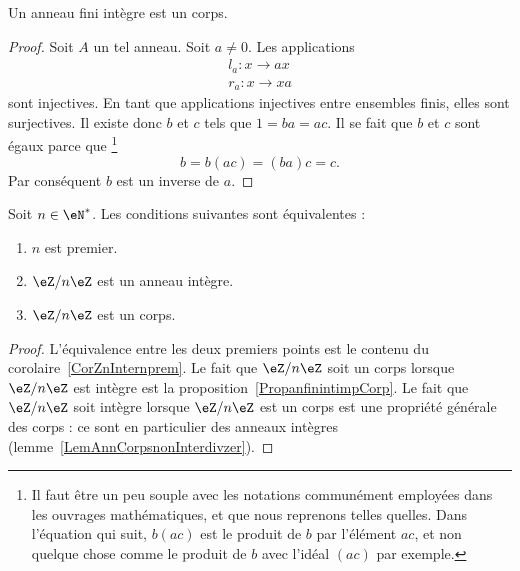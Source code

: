 \begin{proposition}     \label{PropanfinintimpCorp}
    Un anneau fini intègre est un corps.
\end{proposition}

\begin{proof}
    Soit \( A\) un tel anneau. Soit \( a\neq 0\). Les applications
    \begin{subequations}
        \begin{align}
            l_a\colon x\to ax\\
            r_a\colon x\to xa
        \end{align}
    \end{subequations}
    sont injectives. En tant que applications injectives entre ensembles finis, elles sont surjectives. Il existe donc \( b\) et \( c\) tels que \( 1=ba=ac\). Il se fait que \( b\) et \( c\) sont égaux parce que
    \footnote{Il faut être un peu souple avec les notations communément employées dans les ouvrages mathématiques, et que nous reprenons telles quelles. Dans l'équation qui suit, \( b(ac)\) est le produit de \( b\) par l'élément \( ac\), et non quelque chose comme le produit de \( b\) avec l'idéal \( (ac)\) par exemple.}
    \begin{equation}
        b=b(ac)=(ba)c=c.
    \end{equation}
    Par conséquent \( b\) est un inverse de \( a\).
\end{proof}



\begin{proposition}     \label{PropzhFgNJ}
    Soit \( n\in\eN^*\). Les conditions suivantes sont équivalentes :
    \begin{enumerate}
        \item
            \( n\) est premier.
        \item
            \( \eZ/n\eZ\) est un anneau intègre.
        \item
            \( \eZ/n\eZ\) est un corps.
    \end{enumerate}
\end{proposition}

\begin{proof}
    L'équivalence entre les deux premiers points est le contenu du corolaire~\ref{CorZnInternprem}. Le fait que \( \eZ/n\eZ\) soit un corps lorsque \( \eZ/n\eZ\) est intègre est la proposition~\ref{PropanfinintimpCorp}. Le fait que \( \eZ/n\eZ\) soit intègre lorsque \( \eZ/n\eZ\) est un corps est une propriété générale des corps : ce sont en particulier des anneaux intègres (lemme~\ref{LemAnnCorpsnonInterdivzer}).
\end{proof}


